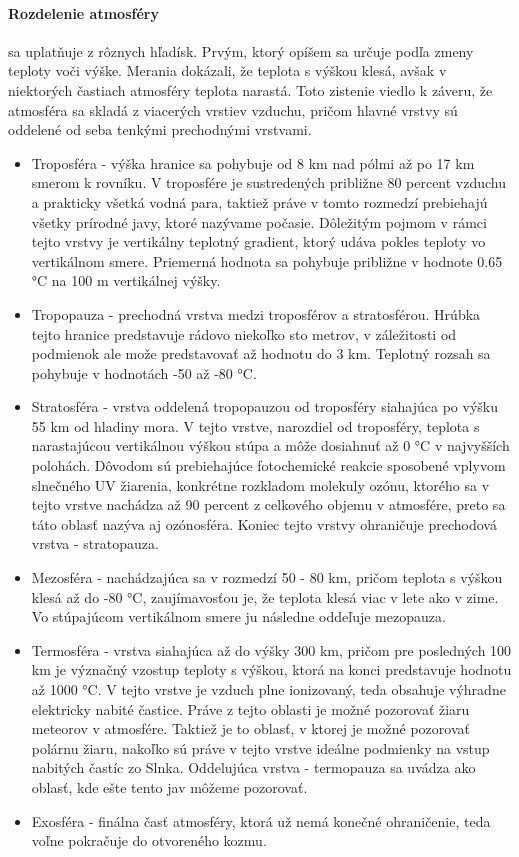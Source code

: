 \paragraph{Rozdelenie atmosféry} sa uplatňuje z rôznych hľadísk. Prvým, ktorý opíšem sa určuje podľa zmeny teploty voči výške. Merania dokázali, že teplota s výškou klesá, avšak v niektorých častiach atmosféry teplota narastá. Toto zistenie viedlo k záveru, že atmosféra sa skladá z viacerých vrstiev vzduchu, pričom hlavné vrstvy sú oddelené od seba tenkými prechodnými vrstvami.
\begin{itemize}
  \item Troposféra - výška hranice sa pohybuje od 8 km nad pólmi až po 17 km smerom k rovníku. V troposfére je sustredených približne 80 percent vzduchu a prakticky všetká vodná para, taktiež práve v tomto rozmedzí prebiehajú všetky prírodné javy, ktoré nazývame počasie. Dôležitým pojmom v rámci tejto vrstvy je vertikálny teplotný gradient, ktorý udáva pokles teploty vo vertikálnom smere. Priemerná hodnota sa pohybuje približne v hodnote 0.65 °C na 100 m vertikálnej výšky.
  \item Tropopauza - prechodná vrstva medzi troposférov a stratosférou. Hrúbka tejto hranice predstavuje rádovo niekoľko sto metrov, v záležitosti od podmienok ale može predstavovať až hodnotu do 3 km. Teplotný rozsah sa pohybuje v hodnotách -50 až -80 °C. 
  \item Stratosféra - vrstva oddelená tropopauzou od troposféry siahajúca po výšku 55 km od hladiny mora. V tejto vrstve, narozdiel od troposféry, teplota s narastajúcou vertikálnou výškou stúpa a môže dosiahnuť až 0 °C v najvyšších polohách. Dôvodom sú prebiehajúce fotochemické reakcie sposobené vplyvom slnečného UV žiarenia, konkrétne rozkladom molekuly ozónu, ktorého sa v tejto vrstve nachádza až 90 percent z celkového objemu v atmosfére, preto sa táto oblasť nazýva aj ozónosféra. Koniec tejto vrstvy ohraničuje prechodová vrstva - stratopauza. 
  \item Mezosféra - nachádzajúca sa v rozmedzí 50 - 80 km, pričom teplota s výškou klesá až do -80 °C, zaujímavosťou je, že teplota klesá viac v lete ako v zime. Vo stúpajúcom vertikálnom smere ju následne oddeľuje mezopauza.
  \item Termosféra - vrstva siahajúca až do výšky 300 km, pričom pre posledných 100 km je význačný vzostup teploty s výškou, ktorá na konci predstavuje hodnotu až 1000 °C. V tejto vrstve je vzduch plne ionizovaný, teda obsahuje výhradne elektricky nabité častice. Práve z tejto oblasti je možné pozorovať žiaru meteorov v atmosfére. Taktiež je to oblasť, v ktorej je možné pozorovať polárnu žiaru, nakoľko sú práve v tejto vrstve ideálne podmienky na vstup nabitých častíc zo Slnka. Oddelujúca vrstva - termopauza sa uvádza ako oblasť, kde ešte tento jav môžeme pozorovať. 
  \item Exosféra - finálna časť atmosféry, ktorá už nemá konečné ohraničenie, teda voľne pokračuje do otvoreného kozmu. 
\end{itemize}

